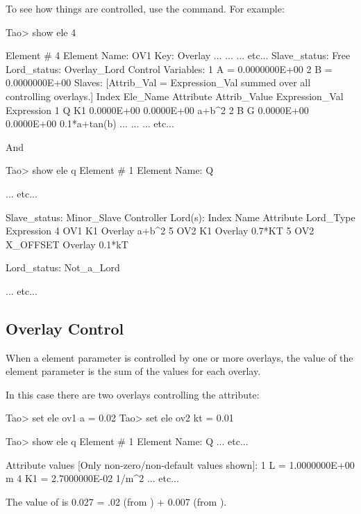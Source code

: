 \documentclass{hitec}
\begin{document}
To see how things are controlled, use the  command. For example:
\begin{code}
Tao> show ele 4

 Element #                4
 Element Name: OV1
 Key: Overlay
... ... ... etc...
Slave_status: Free
Lord_status:  Overlay_Lord
Control Variables:
    1   A                                         =  0.0000000E+00
    2   B                                         =  0.0000000E+00
Slaves: [Attrib_Val = Expression_Val summed over all controlling overlays.]
   Index   Ele_Name  Attribute   Attrib_Value  Expression_Val    Expression
       1   Q         K1            0.0000E+00      0.0000E+00    a+b^2
       2   B         G             0.0000E+00      0.0000E+00    0.1*a+tan(b)
... ... ... etc...
\end{code}

And

\begin{code}
Tao> show ele q
 Element #                1
 Element Name: Q

        ... etc...

Slave_status: Minor_Slave
Controller Lord(s):
   Index   Name        Attribute           Lord_Type           Expression
       4   OV1         K1                  Overlay             a+b^2
       5   OV2         K1                  Overlay             0.7*KT
       5   OV2         X_OFFSET            Overlay             0.1*kT

Lord_status:  Not_a_Lord

        ... etc...
\end{code}

\subsection{Overlay Control}

When a element parameter is controlled by one or more overlays, the value of the element parameter
is the sum of the values for each overlay.

In this case there are two overlays controlling the  attribute:
\begin{code}
Tao> set ele ov1 a = 0.02
Tao> set ele ov2 kt = 0.01

Tao> show ele q
 Element #                1
 Element Name: Q
... etc...

 Attribute values [Only non-zero/non-default values shown]:
    1   L                            =  1.0000000E+00 m
    4   K1                           =  2.7000000E-02 1/m^2
... etc...
\end{code}
The value of  is 0.027 = .02 (from ) + 0.007 (from ).
\end{document}
